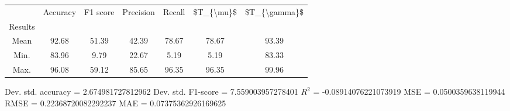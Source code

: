 \begin{tabular}{|c|c|c|c|c|c|c|}
\toprule
{} &  Accuracy &  F1 score &  Precision &  Recall &  \$T\_\{\textbackslash mu\}\$ &  \$T\_\{\textbackslash gamma\}\$ \\
Results &           &           &            &         &            &               \\
\hline
Mean    &     92.68 &     51.39 &      42.39 &   78.67 &      78.67 &         93.39 \\
Min.    &     83.96 &      9.79 &      22.67 &    5.19 &       5.19 &         83.33 \\
Max.    &     96.08 &     59.12 &      85.65 &   96.35 &      96.35 &         99.96 \\
\bottomrule
\end{tabular}

 Dev. std. accuracy = 2.674981727812962
 Dev. std. F1-score = 7.559003957278401
 $R^2$ = -0.08914076221073919
 MSE = 0.0500359638119944
 RMSE = 0.22368720082292237
 MAE = 0.07375362926169625